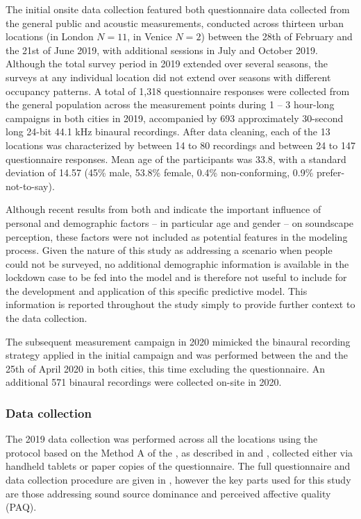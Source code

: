 \documentclass[
  authoryear,
  preprint,
  3p,
  onecolumn]{elsarticle}
\begin{document}
The initial onsite data collection featured both questionnaire data
collected from the general public and acoustic measurements, conducted
across thirteen urban locations (in London \(N=11\), in Venice \(N=2\))
between the 28th of February and the 21st of June 2019, with additional
sessions in July and October 2019. Although the total survey period in
2019 extended over several seasons, the surveys at any individual
location did not extend over seasons with different occupancy patterns.
A total of 1,318 questionnaire responses were collected from the general
population across the measurement points during 1 -- 3 hour-long
campaigns in both cities in 2019, accompanied by 693 approximately
30-second long 24-bit 44.1 kHz binaural recordings. After data cleaning,
each of the 13 locations was characterized by between 14 to 80
recordings and between 24 to 147 questionnaire responses. Mean age of
the participants was 33.8, with a standard deviation of 14.57 (45\%
male, 53.8\% female, 0.4\% non-conforming, 0.9\% prefer-not-to-say).

Although recent results from both \citet{Tarlao2020Investigating} and
\citet{Erfanian2021Psychological} indicate the important influence of
personal and demographic factors -- in particular age and gender -- on
soundscape perception, these factors were not included as potential
features in the modeling process. Given the nature of this study as
addressing a scenario when people could not be surveyed, no additional
demographic information is available in the lockdown case to be fed into
the model and is therefore not useful to include for the development and
application of this specific predictive model. This information is
reported throughout the study simply to provide further context to the
data collection.

The subsequent measurement campaign in 2020 mimicked the binaural
recording strategy applied in the initial campaign and was performed
between the  and the 25th of April 2020 in both cities, this time
excluding the questionnaire. An additional 571 binaural recordings were
collected on-site in 2020.

\subsubsection{Data collection}\label{data-collection}

The 2019 data collection was performed across all the locations using
the protocol based on the Method A of the \citet{ISO12913Part2}, as
described in \citet{Aletta2020Assessing} and
\citet{Mitchell2020Soundscape}, collected either via handheld tablets or
paper copies of the questionnaire. The full questionnaire and data
collection procedure are given in \citet{Mitchell2020Soundscape},
however the key parts used for this study are those addressing sound
source dominance and perceived affective quality (PAQ).
\end{document}
